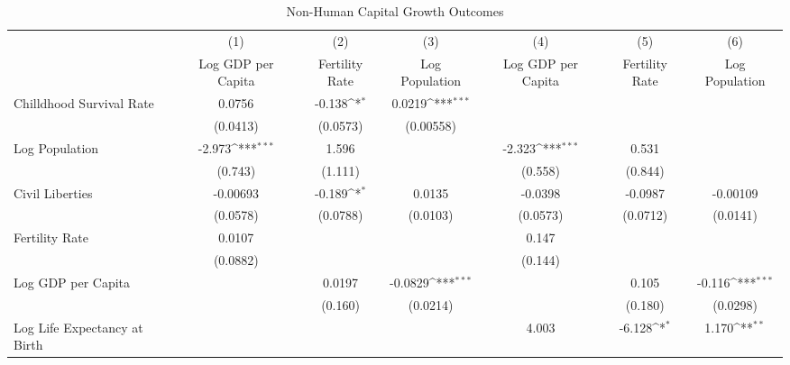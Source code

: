 \begin{table}[htbp]\centering
\def\sym#1{\ifmmode^{#1}\else\(^{#1}\)\fi}
\caption{Non-Human Capital Growth Outcomes}
\begin{tabular}{l*{6}{c}}
\toprule
                &\multicolumn{1}{c}{(1)}&\multicolumn{1}{c}{(2)}&\multicolumn{1}{c}{(3)}&\multicolumn{1}{c}{(4)}&\multicolumn{1}{c}{(5)}&\multicolumn{1}{c}{(6)}\\
                &\multicolumn{1}{c}{Log GDP per Capita}&\multicolumn{1}{c}{Fertility Rate}&\multicolumn{1}{c}{Log Population}&\multicolumn{1}{c}{Log GDP per Capita}&\multicolumn{1}{c}{Fertility Rate}&\multicolumn{1}{c}{Log Population}\\
\midrule
Chilldhood Survival Rate&   0.0756         &   -0.138\sym{*}  &   0.0219\sym{***}&                  &                  &                  \\
                & (0.0413)         & (0.0573)         &(0.00558)         &                  &                  &                  \\
\addlinespace
Log Population  &   -2.973\sym{***}&    1.596         &                  &   -2.323\sym{***}&    0.531         &                  \\
                &  (0.743)         &  (1.111)         &                  &  (0.558)         &  (0.844)         &                  \\
\addlinespace
Civil Liberties & -0.00693         &   -0.189\sym{*}  &   0.0135         &  -0.0398         &  -0.0987         & -0.00109         \\
                & (0.0578)         & (0.0788)         & (0.0103)         & (0.0573)         & (0.0712)         & (0.0141)         \\
\addlinespace
Fertility Rate  &   0.0107         &                  &                  &    0.147         &                  &                  \\
                & (0.0882)         &                  &                  &  (0.144)         &                  &                  \\
\addlinespace
Log GDP per Capita     &                  &   0.0197         &  -0.0829\sym{***}&                  &    0.105         &   -0.116\sym{***}\\
                &                  &  (0.160)         & (0.0214)         &                  &  (0.180)         & (0.0298)         \\
\addlinespace
Log Life Expectancy at Birth&                  &                  &                  &    4.003         &   -6.128\sym{*}  &    1.170\sym{**} \\

\end{tabular}
\end{table}
